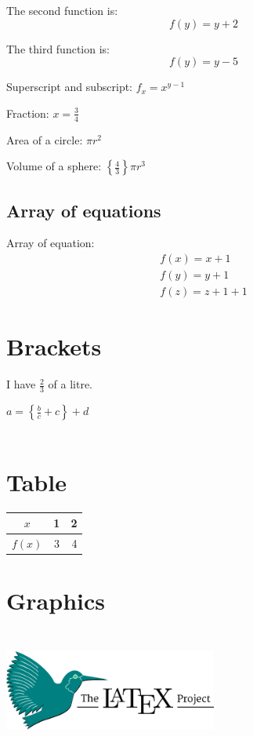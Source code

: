 \documentclass[12pt]{article}
\begin{document}
The second function is: $$f(y) = y+2$$

The third function is:
\begin{equation}
 f(y) = y-5
\end{equation}

Superscript and subscript: $f_x = x^{y-1}$

Fraction: $x = \frac{3}{4}$

Area of a circle: $\pi r^2$

Volume of a sphere: $\left\{\frac{4}{3}\right\}\pi r^3$

\subsection{Array of equations}
Array of equation:
\begin{eqnarray}
f(x) = x+1\\
f(y) = y+1\\
f(z) = z+1+1
\end{eqnarray}

\section{Brackets}
I have $\displaystyle\frac{2}{3}$ of a litre.

$a = \left\{\frac{b}{c}+c\right\}+d$
\\ \\
\section{Table}
\begin{table}[h]
	\centering
	\begin{tabular}{|c|c|r|}
	\hline
	$x$ & 1 & 2\\\hline
	$f(x)$ & 3 & 4\\\hline
\end{tabular}
\end{table}

\section{Graphics}
\begin{center}
\includegraphics[height=4cm, width=7cm]{images.png}
\end{center}
\end{document}
